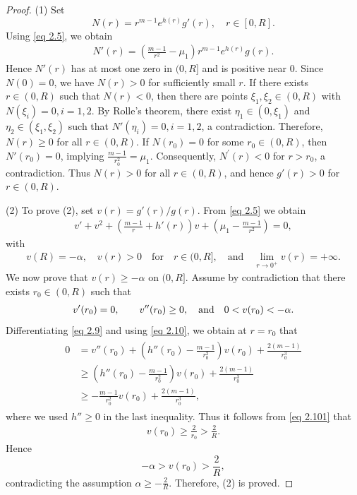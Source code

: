 \documentclass[11pt,leqno]{amsart}
\def\a{\alpha}
\numberwithin{equation}{section}
\begin{document}
\begin{proof}
(1) Set $$N(r)=r^{m-1}e^{h(r)}g'(r), \quad r\in[0, R].$$ 
Using \eqref{eq 2.5}, we obtain
\begin{align*}
N'(r)=\left(\frac{ m-1}{r^2}-\mu_1\right)r^{m-1}e^{h(r)} g(r).
\end{align*}
Hence $N'(r)$ has at most one zero in $(0, R]$ and is positive near $0$. Since $N(0)=0$, we have $N(r)>0$ for sufficiently small $r$. If there exists $r\in(0, R)$ such that
$N(r)<0$, then there are points $\xi_{1},\xi_{2}\in (0,R)$ with $N(\xi_{i})=0,i=1,2$. By Rolle's theorem, there exist $\eta_{1}\in (0,\xi_{1})$ and $\eta_{2}\in (\xi_{1},\xi_{2})$ such that $N'(\eta_{i})=0,i=1,2$, a contradiction. Therefore, $N(r)\geq 0$ for all $r\in (0, R)$.  If $N(r_{0})=0$ for some $r_0\in (0,R)$, then $N'(r_{0})=0$, implying  $\frac{m-1}{r_{0}^{2}}=\mu_1$. Consequently,  $N^{'}(r)<0$ for $r>r_{0}$, a contradiction. Thus $N(r)>0$ for all $r\in (0,R)$, and hence $g'(r)>0$ for $r\in (0, R)$.

(2) To prove (2), set $v(r)=g'(r)/g(r)$. From \eqref{eq 2.5} we obtain
\begin{align}\label{eq 2.9}
v'+v^2+(\frac{m-1}{r}+h'(r))v+\left(\mu_1-\frac{m-1}{r^2}\right)=0,
\end{align}
with
\begin{align}\label{eq 2.10}
  v(R)=-\a,\quad v(r)>0 \quad\text{for}\quad  r\in(0,R], \quad \text{and} \quad \lim\limits_{r\rightarrow 0^+}v(r)=+\infty.  
\end{align}
We now prove that $v(r)\geq-\a$  on $(0, R]$. Assume by contradiction that there exists $r_0\in(0,R)$ such that
\begin{align*}
v'(r_0)=0,\text{\quad \quad} v''(r_0)\ge 0,\text{\quad and\quad} 0<v(r_0)<-\a.
\end{align*}
Differentiating \eqref{eq 2.9}  and using \eqref{eq 2.10}, we obtain at $r=r_0$ that
\begin{align}\label{eq 2.101}
\begin{split}
0&=v''(r_0)+(h''(r_0)-\frac{m-1}{r_0^2})v(r_0)+\frac{2(m-1)}{r_0^3}\\
&\ge (h''(r_0)-\frac{m-1}{r_0^2})v(r_0)+\frac{2(m-1)}{r_0^3}\\
&\ge -\frac{m-1}{r_0^2} v(r_0)+\frac{2(m-1)}{r_0^3},
\end{split}
\end{align}
where we used $h''\ge 0$ in the last inequality. Thus it follows from \eqref{eq 2.101} that
\begin{align*}
v(r_0)\ge \frac 2 {r_0}>\frac 2 R.
\end{align*}
Hence
$$
-\a>v(r_0)>\frac 2 R,
$$
contradicting the assumption $\a\ge -\frac 2 R$. Therefore, (2) is proved.
\end{proof}
\end{document}
